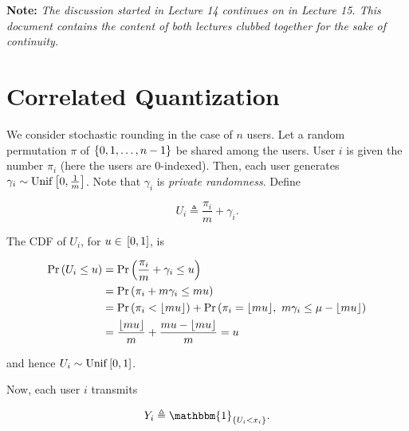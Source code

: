 \documentclass[twoside]{article}
\begin{document}



\textbf{Note:} \textit{
    The discussion started in Lecture 14 continues on in 
    Lecture 15. This document contains the content of both lectures clubbed
    together for the sake of continuity.
}

\section{Correlated Quantization}

We consider stochastic rounding in the case of \(n\) users. Let a random 
permutation \(\pi\) of \(\left\{0,1,\ldots,n-1\right\}\) be shared among the users.
User \(i\) is given the number \(\pi_i\) (here the users are 0-indexed). Then,
each user generates \(\gamma_i \sim \mathrm{Unif}{}\left[0,\frac{1}{m}\right]\).
Note that \(\gamma_i\) is \emph{private randomness}. Define

\begin{equation}
    U_i \triangleq \frac{\pi_i}{m} + \gamma_i.
    \label{eq:Ui-def}
\end{equation}

The CDF of \(U_i\), for \(u \in {}\left[0,1\right]\), is

\begin{align}
    \Pr\left(U_i\le u\right) &= \Pr\left(\frac{\pi_i}{m}+ \gamma_i \le u\right) \\
                  &= \Pr\left(\pi_i + m\gamma_i \le mu\right) \\
                  &= \Pr\left(\pi_i < \lfloor mu\rfloor\right) + \Pr\left(\pi_i = \lfloor mu\rfloor,\ m\gamma_i \le \mu - \lfloor mu\rfloor\right) \\
                  &= \frac{\lfloor mu\rfloor}{m} + \frac{mu-\lfloor mu\rfloor}{m} = u
                  \label{eq:ui-cdf}
\end{align}

and hence \(U_i \sim \mathrm{Unif}{}\left[0,1\right]\).

Now, each user \(i\) transmits

\begin{equation}
    Y_i \triangleq \mathbbm{1}_{\cbrak{U_i<x_i}}.
    \label{eq:Yi-def}
\end{equation}
\end{document}
